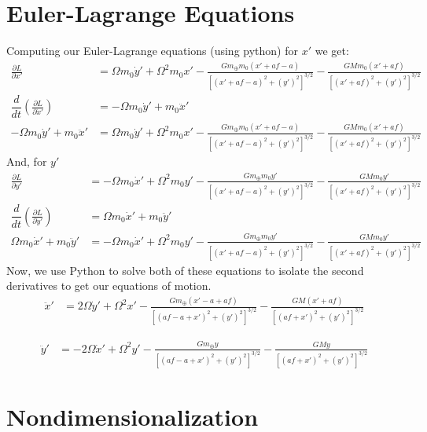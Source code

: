 \documentclass[11pt]{article}
\begin{document}
\section{Euler-Lagrange Equations}
Computing our Euler-Lagrange equations (using python) for $x'$ we get:
\begin{align}
        \frac{\partial L}{\partial x'} &=\Omega m_{0} \dot y' 
        +\Omega ^2 m_{0} x' -\frac{Gm_\oplus m_{0}(x'+af-a)}{[(x'+af-a)^2 +(y')^2]^{3/2}}-\frac{GM m_{0}(x'+af)}{[(x'+af)^2 +(y')^2]^{3/2}} \\
        \dfrac{d}{dt}\left(\frac{\partial L}{\partial \dot x'}\right) &=-\Omega m_{0} \dot y' 
        + m_{0}\ddot x' \\
        -\Omega m_{0} \dot y' + m_{0}\ddot x' &=\Omega m_{0} \dot y' 
        +\Omega ^2 m_{0} x' -\frac{Gm_\oplus m_{0}(x'+af-a)}{[(x'+af-a)^2 +(y')^2]^{3/2}}-\frac{GM m_{0}(x'+af)}{[(x'+af)^2 +(y')^2]^{3/2}}
\end{align}
And, for $y'$
\begin{align}
        \frac{\partial L}{\partial y'} &=-\Omega m_{0} \dot x' 
        +\Omega ^2 m_{0} y' -\frac{Gm_\oplus m_{0}y'}{[(x'+af-a)^2 +(y')^2]^{3/2}}-\frac{GM m_{0}y'}{[(x'+af)^2 +(y')^2]^{3/2}} \\
        \dfrac{d}{dt}(\frac{\partial L}{\partial \dot y'}) &=\Omega m_{0} \dot x' 
        + m_{0}\ddot y' \\
        \Omega m_{0} \dot x' 
        + m_{0}\ddot y' &=-\Omega m_{0} \dot x' 
        +\Omega ^2 m_{0} y' -\frac{Gm_\oplus m_{0}y'}{[(x'+af-a)^2 +(y')^2]^{3/2}}-\frac{GM m_{0}y'}{[(x'+af)^2 +(y')^2]^{3/2}}
\end{align}
Now, we use Python to solve both of these equations to isolate the second derivatives to get our equations of motion.
\begin{align}
    \ddot  x' &= 2 \Omega \dot y' +\Omega ^2 x' - \frac{Gm_\oplus (x'-a+af)}{[(af-a+x')^2 +(y') ^2]^{3/2}} -\frac{GM (x'+af)}{[(af+x')^2 +(y') ^2]^{3/2}}
\end{align}

\begin{align}
    \ddot  y' &= -2 \Omega \dot x' +\Omega ^2 y' - \frac{Gm_\oplus y}{[(af-a+x')^2 +(y') ^2]^{3/2}} -\frac{GM y}{[(af+x')^2 +(y') ^2]^{3/2}}
\end{align}



\section{Nondimensionalization}
\end{document}
